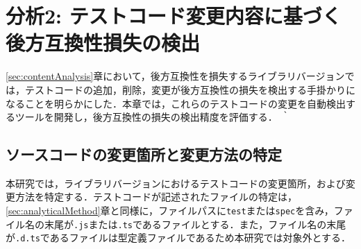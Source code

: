 \documentclass[submit]{ipsj}
\begin{document}
{\vspace{-2mm}
\section{分析2: テストコード変更内容に基づく後方互換性損失の検出}\label{chap:rq2}

\ref{sec:contentAnalysis}章において，後方互換性を損失するライブラリバージョンでは，テストコードの追加，削除，変更が後方互換性の損失を検出する手掛かりになることを明らかにした．本章では，これらのテストコードの変更を自動検出するツールを開発し，後方互換性の損失の検出精度を評価する．
｀


\subsection{ソースコードの変更箇所と変更方法の特定}\label{subsec:rq2.astseisei}
本研究では，ライブラリバージョンにおけるテストコードの変更箇所，および変更方法を特定する．テストコードが記述されたファイルの特定は，\ref{sec:analyticalMethod}章と同様に，ファイルパスに{\verb|test|}または{\verb|spec|}を含み，ファイル名の末尾が{\verb|.js|}または{\verb|.ts|}であるファイルとする．また，ファイル名の末尾が{\verb|.d.ts|}であるファイルは型定義ファイルであるため本研究では対象外とする．

}
\end{document}
